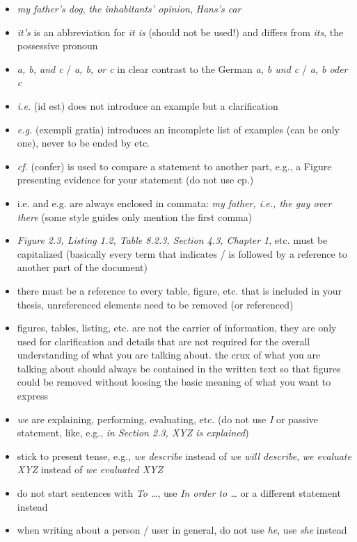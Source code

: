 \documentclass{article}
\begin{document}
\begin{itemize}
	\item \emph{my father's dog}, \emph{the inhabitants' opinion}, \emph{Hans's car}
	\item \emph{it's} is an abbreviation for \emph{it is} (should not be used!) and differs from \emph{its}, the possessive pronoun
	\item \emph{a, b, and c} / \emph{a, b, or c} in clear contrast to the German \emph{a, b und c} / \emph{a, b oder c}
	\item \emph{i.e.} (id est) does not introduce an example but a clarification
	\item \emph{e.g.} (exempli gratia) introduces an incomplete list of examples (can be only one), never to be ended by etc.
	\item \emph{cf.} (confer) is used to compare a statement to another part, e.g., a Figure presenting evidence for your statement (do not use cp.)
	\item i.e. and e.g. are always enclosed in commata: \emph{my father, i.e., the guy over there} (some style guides only mention the first comma)
	\item \emph{Figure 2.3, Listing 1.2, Table 8.2.3, Section 4.3, Chapter 1}, etc. must be capitalized (basically every term that indicates / is followed by a reference to another part of the document)
	\item there must be a reference to every table, figure, etc. that is included in your thesis, unreferenced elements need to be removed (or referenced)
	\item figures, tables, listing, etc. are not the carrier of information, they are only used for clarification and details that are not required for the overall understanding of what you are talking about. the crux of what you are talking about should always be contained in the written text so that figures could be removed without loosing the basic meaning of what you want to express
	\item \emph{we} are explaining, performing, evaluating, etc. (do not use \emph{I} or passive statement, like, e.g., \emph{in Section 2.3, XYZ is explained})
	\item stick to present tense, e.g., \emph{we describe} instead of \emph{we will describe}, \emph{we evaluate XYZ} instead of \emph{we evaluated XYZ}
	\item do not start sentences with \emph{To \dots}, use \emph{In order to \dots} or a different statement instead
	\item when writing about a person / user in general, do not use \emph{he}, use \emph{she} instead
\end{itemize}
\end{document}
